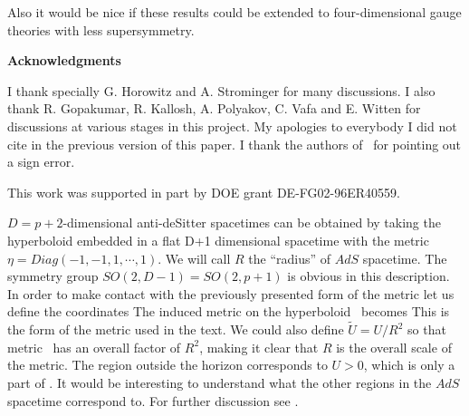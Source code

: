 Also it would be nice if these results could be extended to 
four-dimensional gauge theories with less supersymmetry. 


            




{\bf Acknowledgments}

I thank specially G. Horowitz and A. Strominger for many discussions.
I also thank R. Gopakumar, 
 R. Kallosh, A. Polyakov,  C. Vafa and E. Witten for discussions 
at various stages in this project. 
My apologies to everybody   I did not cite in the previous version of
this paper. I thank the authors of \kal\ for pointing out a sign error.


This work was supported in part by 
DOE grant
DE-FG02-96ER40559.




$D=p+2$-dimensional anti-deSitter spacetimes can be obtained by taking 
the hyperboloid 
\eqn{}
embedded in a flat D+1 dimensional spacetime with the metric 
$ \eta = Diag( -1,-1,1,\cdots,1)$. 
We will call $R$ the ``radius'' of $AdS$ spacetime. 
The symmetry group 
$SO(2,D-1)= SO(2,p+1)$ is obvious in this description. 
In order to make contact with the previously presented form  of the metric 
let us define the coordinates
\eqn{}
The induced metric on the hyperboloid \hyperb\ becomes
\eqn{}
This is  the form of the metric used in the text.
We could also define $\tilde U = U/R^2$ so  that metric \indmet\
has  an overall factor of $R^2$, making it clear that $R$ is the
overall scale of the metric. 
The region outside the horizon corresponds to $U>0$, which is 
only a part of \hyperb . It would be interesting to understand what
the other regions in the $AdS$ spacetime correspond to. For 
further discussion see \hawellis .







\listrefs






\bye






